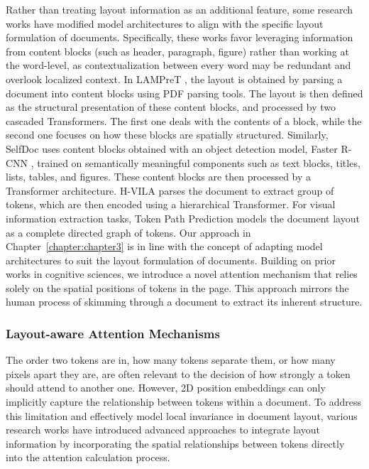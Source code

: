 Rather than treating layout information as an additional feature, some research works have modified model architectures to align with the specific layout formulation of documents. Specifically, these works favor leveraging information from content blocks (such as header, paragraph, figure) rather than working at the word-level, as contextualization between every word may be redundant and overlook localized context. In \ac{LAMPreT} \citep{wu2021lampret}, the layout is obtained by parsing a document into content blocks using PDF parsing tools. The layout is then defined as the structural presentation of these content blocks, and processed by two cascaded Transformers. The first one deals with the contents of a block, while the second one focuses on how these blocks are spatially structured. Similarly, SelfDoc \citep{li2021selfdoc} uses content blocks obtained with an object detection model, Faster R-CNN \citep{ren2015faster}, trained on semantically meaningful components such as text blocks, titles, lists, tables, and figures. These content blocks are then processed by a Transformer architecture. H-VILA \citep{shen2022vila} parses the document to extract group of tokens, which are then encoded using a hierarchical Transformer. For visual information extraction tasks, Token Path Prediction \citep{zhang2023reading} models the document layout as a complete directed graph of tokens. Our approach  in Chapter~\ref{chapter:chapter3} is in line with the concept of adapting model architectures to suit the layout formulation of documents. Building on prior works in cognitive sciences, we introduce a novel attention mechanism that relies solely on the spatial positions of tokens in the page. This approach mirrors the human process of skimming through a document to extract its inherent structure.


\subsubsection{Layout-aware Attention Mechanisms}

The order two tokens are in, how many tokens separate them, or how many pixels apart they are, are often relevant to the decision of how strongly a token should attend to another one. However, 2D position embeddings can only implicitly capture the relationship between tokens within a document. To address this limitation and effectively model local invariance in document layout, various research works have introduced advanced approaches to integrate layout information by incorporating the spatial relationships between tokens directly into the attention calculation process.

